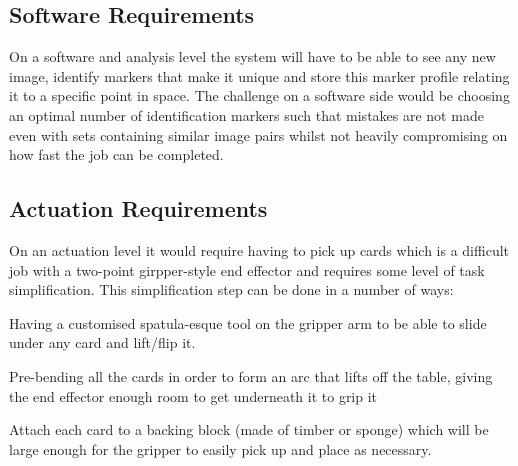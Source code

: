 \documentclass[dvips,12pt]{article}
\begin{document}
	\subsection{Software Requirements}
		On a software and analysis level the system will have to be able to see any new image, identify markers that make it unique and store this marker profile relating it to a specific point in space. The challenge on a software side would be choosing an optimal number of  identification markers such that mistakes are not made even with sets containing similar image pairs whilst not heavily compromising on how fast the job can be completed.
	\subsection{Actuation Requirements}
		On an actuation level it would require having to pick up cards which is a difficult job with a two-point girpper-style end effector and requires some level of task simplification. This simplification step can be done in a number of ways:
		\begin{list}{:~}{}
			\item Having a customised spatula-esque tool on the gripper arm to be able to slide under any card and lift/flip it.
			\item Pre-bending all the cards in order to form an arc that lifts off the table, giving the end effector enough room to get underneath it to grip it
			\item Attach each card to a backing block (made of timber or sponge) which will be large enough for the gripper to easily pick up and place as necessary.
		\end{list}
		

		
		\newpage
		\begin{thebibliography}{99}
			
						
		\end{thebibliography}
		
\end{document}
